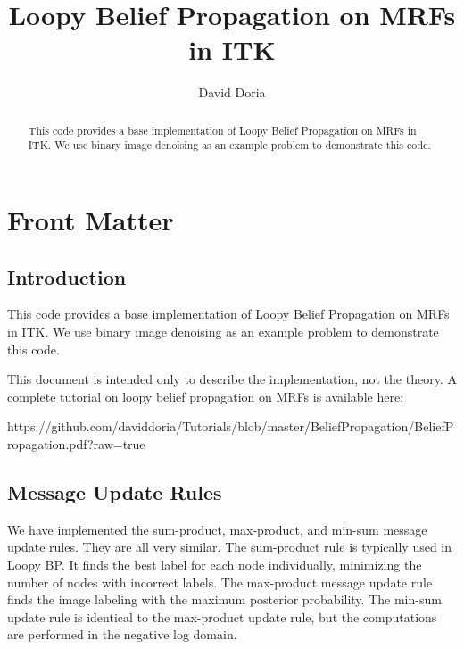\documentclass{InsightArticle}
\title{Loopy Belief Propagation on MRFs in ITK}
\author{David Doria}
\newcommand{\IJhandlerIDnumber}{3253}
\begin{document}
%
% 
\IJhandlefooter{\IJhandlerIDnumber}


\ifpdf
\else
\fi


\maketitle


\ifhtml
\chapter*{Front Matter\label{front}}
\fi


\begin{abstract}
\noindent
This code provides a base implementation of Loopy Belief Propagation on MRFs in ITK. We use binary image denoising as an example problem to demonstrate this code.

\end{abstract}

\IJhandlenote{\IJhandlerIDnumber}

\tableofcontents

\section{Introduction}
This code provides a base implementation of Loopy Belief Propagation on MRFs in ITK. We use binary image denoising as an example problem to demonstrate this code.

This document is intended only to describe the implementation, not the theory. A complete tutorial on loopy belief propagation on MRFs is available here:

\small https://github.com/daviddoria/Tutorials/blob/master/BeliefPropagation/BeliefPropagation.pdf?raw=true
\normalsize

\section{Message Update Rules}
We have implemented the sum-product, max-product, and min-sum message update rules. They are all very similar. The sum-product rule is typically used in Loopy BP. It finds the best label for each node individually, minimizing the number of nodes with incorrect labels. The max-product message update rule finds the image labeling with the maximum posterior probability. The min-sum update rule is identical to the max-product update rule, but the computations are performed in the negative log domain.
\end{document}
